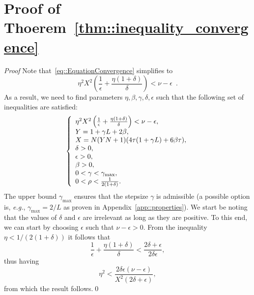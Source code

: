 \documentclass[envcountsect]{svjour3}
\newcommand{\eg}{{\it e.g.}}
\begin{document}
\section{Proof of Thoerem~\ref{thm::inequality_convergence} }{\label{app::Conv5:Convergence}}
{\it Proof}
Note that~\eqref{eq::EquationConvergence} simplifies to
\[
  \eta^2X^2\left(\frac{1}{\epsilon}+\frac{\eta(1+\delta)}{\delta}\right) < \nu-\epsilon \enspace.
\]
As a result, we need to find parameters $\eta,\beta,\gamma,\delta,\epsilon$ such that the following set of inequalities are satisfied:
\begin{equation}{\label{eq::EquationConvergence2}}
\left\{
\begin{array}{l}
 \eta^2X^2\left(\frac{1}{\epsilon}+\frac{\eta(1+\delta)}{\delta}\right) < \nu-\epsilon,\\
 Y = 1+\gamma L+2\beta,\\
 X = N(YN+1)(4\tau(1+\gamma L)+6\beta\tau),\\
 \delta>0,\\
 \epsilon>0,\\
 \beta>0,\\
  0<\gamma<\gamma_{\max},\\
  0<\rho<\frac{1}{2(1+\delta)}.
 \end{array}
 \right.
\end{equation}
The upper bound $\gamma_{\max}$ ensures that the stepsize $\gamma$ is admissible (a possible option is, \eg, $\gamma_{\max}=2/L$ as proven in Appendix~\ref{app::properties}).
We start be noting that the values of $\delta$ and $\epsilon$ are irrelevant as long as they are positive. To this end, we can start by choosing $\epsilon$ such that
$\nu-\epsilon>0$.
From the inequality $\eta<1/(2(1+\delta))$ it follows that
\[
\frac{1}{\epsilon} + \frac{\eta(1+\delta)}{\delta} < \frac{2\delta+\epsilon}{2\delta\epsilon},
\]
thus having
\[
 \eta^2 < \frac{2\delta\epsilon(\nu-\epsilon)}{X^2(2\delta+\epsilon)},
\]
from which the result follows.\qed


\end{document}
